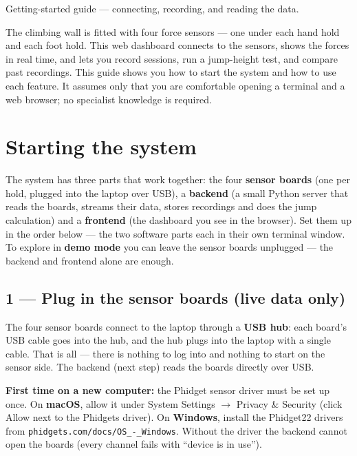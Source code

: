 \documentclass[11pt,a4paper]{article}
\begin{document}
%
  {Getting-started guide --- connecting, recording, and reading the data.}

The climbing wall is fitted with four force sensors --- one under each hand hold
and each foot hold. This web dashboard connects to the sensors, shows the
forces in real time, and lets you record sessions, run a jump-height test, and
compare past recordings. This guide shows you how to start the system and how to
use each feature. It assumes only that you are comfortable opening a terminal and
a web browser; no specialist knowledge is required.

\section{Starting the system}

The system has three parts that work together: the four \textbf{sensor boards}
(one per hold, plugged into the laptop over USB), a \textbf{backend} (a small
Python server that reads the boards, streams their data, stores recordings and does
the jump calculation) and a \textbf{frontend} (the dashboard you see in the
browser). Set them up in the order below --- the two software parts each in their
own terminal window. To explore in \textbf{demo mode} you can leave the sensor
boards unplugged --- the backend and frontend alone are enough.

\subsection*{1 --- Plug in the sensor boards (live data only)}
The four sensor boards connect to the laptop through a \textbf{USB hub}: each
board's USB cable goes into the hub, and the hub plugs into the laptop with a
single cable. That is all --- there is nothing to log into and nothing to start on
the sensor side. The backend (next step) reads the boards directly over USB.

\begin{infobox}
\textbf{First time on a new computer:} the Phidget sensor driver must be set up
once. On \textbf{macOS}, allow it under \textsf{System Settings $\rightarrow$
Privacy \& Security} (click \textsf{Allow} next to the Phidgets driver). On
\textbf{Windows}, install the Phidget22 drivers from
\texttt{phidgets.com/docs/OS\_-\_Windows}. Without the driver the backend cannot
open the boards (every channel fails with ``device is in use'').
\end{infobox}
\end{document}
